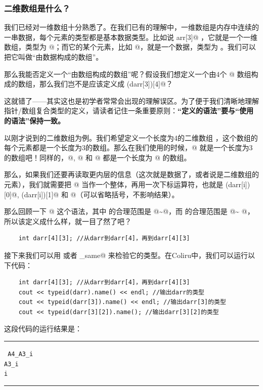 \subsubsection*{二维数组是什么？}
我们已经对一维数组十分熟悉了。在我们已有的理解中，一维数组是内存中连续的一串数据，每个元素的类型都是基本数据类型。比如说 \lstinline@int arr[3]@ ，它就是一个一维数组，类型为 \lstinline@int[3]@；而它的某个元素，比如 \lstinline@arr[0]@，就是一个数据，类型为 \lstinline@int@。我们可以把它叫做``由数据构成的数组''。\par
那么我能否定义一个``由数组构成的数组''呢？假设我们想定义一个由4个 \lstinline@arr[3]@ 数组构成的数组，那么我们岂不是应该定义成 \lstinline@int (darr[3])[4]@？\par
这就错了——其实这也是初学者常常会出现的理解误区。为了便于我们清晰地理解指针/数组复合类型的定义，请读者记住一条重要原则：\textbf{``定义的语法''要与``使用的语法''保持一致。}\par
以刚才说到的二维数组为例。我们希望定义一个长度为4的二维数组 \lstinline@darr@，这个数组的每个元素都是一个长度为3的数组。那么在我们使用的时候，\lstinline@darr[0]@ 就是一个长度为3的数组吧！同样的，\lstinline@darr[1]@, \lstinline@darr[2]@ 和 \lstinline@darr[3]@ 都是一个长度为 @ 的数组。\par
那么，如果我们还要再读取更内层的信息（这次就是数据了，或者说是二维数组的元素），我们就需要把 \lstinline@darr[i]@ 当作一个整体，再用一次下标运算符，也就是 \lstinline@(darr[i])[0]@, \lstinline@(darr[i])[1]@ 和 \lstinline@darr[i][2]@（可以省略括号，不影响结果）。\par
那么回顾一下 \lstinline@darr[i][j]@ 这个语法，其中 \lstinline@i@ 的合理范围是 @\~{}@，而 \lstinline@j@ 的合理范围是 @\~{} @，所以该定义成什么样，就一目了然了吧？
\begin{lstlisting}
    int darr[4][3]; //从darr到darr[4]，再到darr[4][3]
\end{lstlisting}
接下来我们可以用 \lstinline@typeid@ 或者 \lstinline@is_same@ 来检验它的类型。在Coliru中，我们可以运行以下代码：
\begin{lstlisting}
    int darr[4][3]; //从darr到darr[4]，再到darr[4][3]
    cout << typeid(darr).name() << endl; //输出darr的类型
    cout << typeid(darr[3]).name() << endl; //输出darr[3]的类型
    cout << typeid(darr[3][2]).name(); //输出darr[3][2]的类型
\end{lstlisting}
这段代码的运行结果是：\\\noindent\rule{\linewidth}{.2pt}\texttt{
A4\_A3\_i\\
A3\_i\\
i
}\\\noindent\rule{\linewidth}{.2pt}\par
